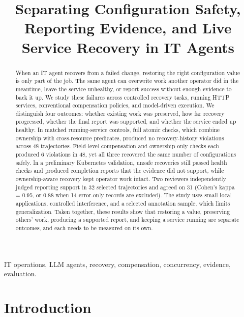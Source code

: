 \documentclass[conference,10pt]{IEEEtran}
\title{Separating Configuration Safety, Reporting Evidence, and Live Service Recovery in IT Agents}
\author{\IEEEauthorblockN{Santosh Sibyala}\IEEEauthorblockA{ORCID: 0009-0000-5970-4166\\santoshsibyala@gmail.com}}
\begin{document}
\maketitle


\begin{abstract}

When an IT agent recovers from a failed change, restoring the right configuration value is only part of the job. The same agent can overwrite work another operator did in the meantime, leave the service unhealthy, or report success without enough evidence to back it up. We study these failures across controlled recovery tasks, running HTTP services, conventional compensation policies, and model-driven execution. We distinguish four outcomes: whether existing work was preserved, how far recovery progressed, whether the final report was supported, and whether the service ended up healthy. In matched running-service controls, full atomic checks, which combine ownership with cross-resource predicates, produced no recovery-history violations across 48 trajectories. Field-level compensation and ownership-only checks each produced 6 violations in 48, yet all three recovered the same number of configurations safely. In a preliminary Kubernetes validation, unsafe recoveries still passed health checks and produced completion reports that the evidence did not support, while ownership-aware recovery kept operator work intact. Two reviewers independently judged reporting support in 32 selected trajectories and agreed on 31 (Cohen's kappa = 0.95, or 0.88 when 14 error-only records are excluded). The study uses small local applications, controlled interference, and a selected annotation sample, which limits generalization. Taken together, these results show that restoring a value, preserving others' work, producing a supported report, and keeping a service running are separate outcomes, and each needs to be measured on its own.

\end{abstract}

\begin{IEEEkeywords}

IT operations, LLM agents, recovery, compensation, concurrency, evidence, evaluation.

\end{IEEEkeywords}

\section{Introduction}
\end{document}
